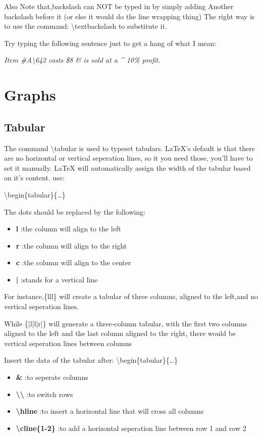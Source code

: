 \documentclass[a4paper,12pt]{article}
\begin{document}
Also Note that,backslash can NOT be typed in by simply adding Another
backslash before it (or else it would do the line wrapping thing)
The right way is to use the command:
 \textbackslash textbackslash to substitute it.

Try typing the following sentence just to get a hang of what I mean:

\textit{ Item \#A\textbackslash642 costs \$8 \& is sold
at a \^{} 10\% profit.}
\section{Graphs}
\subsection{Tabular}
The command \textbackslash tabular is used to typeset tabulars.
LaTeX's default is that there are no horizontal or vertical 
seperation lines, so it you need those, you'll have to set it manually.
LaTeX will automatically assign the width of the tabular based on it's content.
use:

\textbackslash begin\{tabular\}\{\dots\}


The dots should be replaced by the following:
\begin{itemize}
    \item \textbf{l} :the column will align to the left
    \item \textbf{r} :the column will align to the right
    \item \textbf{c} :the column will align to the center
    \item \textbf{|} :stands for a vertical line
\end{itemize}

For instance,\{lll\} will create a tabular of three columns,
aligned to the left,and no vertical seperation lines.

While \{|l|l|r|\} will generate a three-column tabular,
with the first two columns aligned to the left
and the last column aligned to the right,
there would be vertical seperation lines between columns

Insert the data of the tabular after: \textbackslash begin\{tabular\}\{\dots\}
\begin{itemize}
    \item \textbf{\&} :to seperate columns
    \item \textbf{\textbackslash\textbackslash} :to switch rows
    \item \textbf{\textbackslash hline} :to insert a 
    horizontal line that will cross all columns
    \item \textbf{\textbackslash cline\{1-2\}} :to add a horizontal seperation
    line between row 1 and row 2

\end{itemize}
\end{document}
